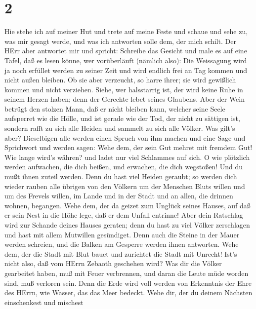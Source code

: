 \hypertarget{section-1}{%
\section{2}\label{section-1}}

 Hie stehe ich auf meiner Hut und trete auf meine Feste und
schaue und sehe zu, was mir gesagt werde, und was ich antworten solle
dem, der mich schilt.  Der HErr aber antwortet mir und
spricht: Schreibe das Gesicht und male es auf eine Tafel, daß es lesen
könne, wer vorüberläuft (nämlich also):  Die Weissagung wird
ja noch erfüllet werden zu seiner Zeit und wird endlich frei an Tag
kommen und nicht außen bleiben. Ob sie aber verzeucht, so harre ihrer;
sie wird gewißlich kommen und nicht verziehen.  Siehe, wer
halsstarrig ist, der wird keine Ruhe in seinem Herzen haben; denn der
Gerechte lebet seines Glaubens.  Aber der Wein betrügt den
stolzen Mann, daß er nicht bleiben kann, welcher seine Seele aufsperret
wie die Hölle, und ist gerade wie der Tod, der nicht zu sättigen ist,
sondern rafft zu sich alle Heiden und sammelt zu sich alle Völker.
 Was gilt's aber? Dieselbigen alle werden einen Spruch von
ihm machen und eine Sage und Sprichwort und werden sagen: Wehe dem, der
sein Gut mehret mit fremdem Gut! Wie lange wird's währen? und ladet nur
viel Schlammes auf sich.  O wie plötzlich werden aufwachen,
die dich beißen, und erwachen, die dich wegstoßen! Und du mußt ihnen
zuteil werden.  Denn du hast viel Heiden geraubt; so werden
dich wieder rauben alle übrigen von den Völkern um der Menschen Bluts
willen und um des Frevels willen, im Lande und in der Stadt und an
allen, die drinnen wohnen, begangen.  Wehe dem, der da
geizet zum Unglück seines Hauses, auf daß er sein Nest in die Höhe lege,
daß er dem Unfall entrinne!  Aber dein Ratschlag wird zur
Schande deines Hauses geraten; denn du hast zu viel Völker zerschlagen
und hast mit allem Mutwillen gesündiget.  Denn auch die
Steine in der Mauer werden schreien, und die Balken am Gesperre werden
ihnen antworten.  Wehe dem, der die Stadt mit Blut bauet
und zurichtet die Stadt mit Unrecht!  Ist's nicht also, daß
vom HErrn Zebaoth geschehen wird? Was dir die Völker gearbeitet haben,
muß mit Feuer verbrennen, und daran die Leute müde worden sind, muß
verloren sein.  Denn die Erde wird voll werden von
Erkenntnis der Ehre des HErrn, wie Wasser, das das Meer bedeckt.
 Wehe dir, der du deinem Nächsten einschenkest und mischest
